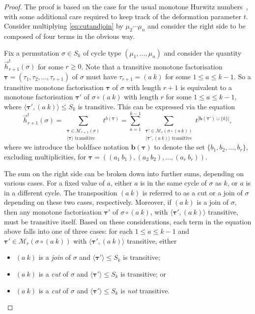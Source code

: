 \documentclass[a4paper]{article}
\theoremstyle{plain}
\numberwithin{theorem}{section}
\theoremstyle{definition}
\theoremstyle{remark}
\renewcommand{\leq}{\leqslant}
\renewcommand{\geq}{\geqslant}
\newcommand{\SG}{S} 					%
\newcommand{\hn}[2]{\vec{h}^{t}_{#1}(#2)}
\begin{document}
\begin{proof} 
The proof is based on the case for the usual monotone Hurwitz numbers~\cite{gou-gua-nov13a}, with some additional care required to keep track of the deformation parameter $t$. Consider multiplying \cref{eq:cutandjoin} by $\mu_2 \cdots \mu_n$ and consider the right side to be composed of four terms in the obvious way.


Fix a permutation $\sigma \in \SG_k$ of cycle type $(\mu_1, \ldots, \mu_n)$ and consider the quantity $\hn{r+1}{\sigma}$ for some $r \geq 0$. Note that a transitive monotone factorisation $\bm{\tau} = (\tau_1, \tau_2, \ldots, \tau_{r+1})$ of $\sigma$ must have $\tau_{r+1} = (a~k)$ for some $1\leq a \leq k-1$. So a transitive monotone factorisation $\bm{\tau}$ of $\sigma$ with length $r+1$ is equivalent to a monotone factorisation $\bm{\tau}'$ of $\sigma\circ (a~k)$ with length $r$ for some $1 \leq a \leq k-1$, where $\langle \bm{\tau}', (a~k)\rangle \leq \SG_k$ is transitive. This can be expressed via the equation
\[
\hn{r+1}{\sigma} = \sum_{\substack{\bm{\tau} \in \mathcal{M}_{r+1}(\sigma) \\ \langle\bm{\tau}\rangle \text{ transitive}}} t^{b(\bm{\tau})} = \sum_{a=1}^{k-1}\sum_{\substack{\bm{\tau}' \in \mathcal{M}_r(\sigma \circ (a~ k)) \\ \langle\bm{\tau}',(a~k)\rangle \text{ transitive}}} t^{|\bm{b}(\bm{\tau}')\cup\{k\}|},
\]
where we introduce the boldface notation $\bm{b}(\bm{\tau})$ to denote the set $\{b_1, b_2, \ldots, b_r\}$, excluding multiplicities, for $\bm{\tau} = ((a_1~b_1), (a_2~b_2), \ldots, (a_r~b_r))$.


The sum on the right side can be broken down into further sums, depending on various cases. For a fixed value of $a$, either $a$ is in the same cycle of $\sigma$ as $k$, or $a$ is in a different cycle. The transposition $(a~k)$ is referred to as a cut or a join of $\sigma$ depending on these two cases, respectively. Moreover, if $(a~k)$ is a join of $\sigma$, then any monotone factorisation $\bm{\tau}'$ of $\sigma \circ (a~k)$, with $\langle \bm{\tau}', (a~k)\rangle$ transitive, must be transitive itself. Based on these considerations, each term in the equation above falls into one of three cases: for each $1\leq a\leq k-1$ and $\bm{\tau}'\in\mathcal{M}_r(\sigma \circ (a~k))$ with $\langle\bm{\tau}',(a~k)\rangle$ transitive, either
\begin{itemize}
\item $(a~k)$ is a \textit{join} of $\sigma$ and $\langle\bm{\tau}'\rangle \leq \SG_k$ is transitive;
\item $(a~k)$ is a \textit{cut} of $\sigma$ and $\langle\bm{\tau}'\rangle \leq \SG_k$ is transitive; or
\item $(a~k)$ is a \textit{cut} of $\sigma$ and $\langle\bm{\tau}' \rangle \leq \SG_k$ is {\em not} transitive.
\end{itemize}



\end{proof}
\end{document}

